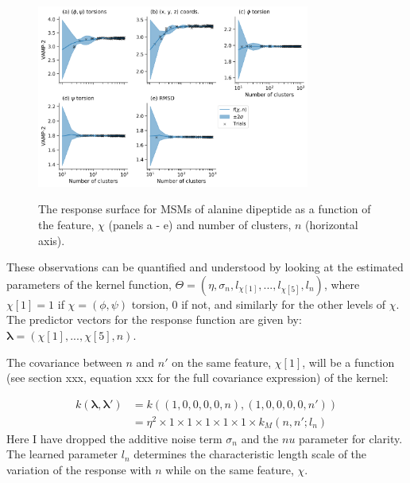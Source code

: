 
\begin{figure}
    \centering
    \caption{The response surface for MSMs of alanine dipeptide as a function of the feature, $\chi$ (panels a - e) and number of clusters, $n$ (horizontal axis).  }
    \includegraphics[width=0.8\textwidth]{chapters/msm_optimization/figures/ala1_response_surface.png}
    \label{fig:ala1_response}
\end{figure}

These observations can be quantified and understood by looking at the estimated parameters of the kernel function, $\Theta = (\eta, \sigma_n, l_{\chi[1]}, ..., l_{\chi[5]}, l_{n}) $, where $\chi[1] = 1$ if $\chi = (\phi, \psi)$ torsion, $0$ if not, and similarly for the other levels of $\chi$. The predictor vectors for the response function are given by: $\mathbf{\lambda} = \left(\chi[1],...,\chi[5],n\right)$.

The covariance between $n$ and $n'$ on the same feature, $\chi[1]$, will be a function (see section xxx, equation xxx for the full covariance expression) of the kernel:

\begin{equation}
\begin{split}
    k(\mathbf{\lambda}, \mathbf{\lambda}')& = k\left((1, 0, 0, 0, 0, n), (1, 0, 0, 0, 0, n')\right) \\
    & = \eta^{2}\times 1 \times 1\times 1 \times 1\times 1 \times k_{M}(n, n'; l_{n})
\end{split}
\end{equation}
Here I have dropped the additive noise term $\sigma_{n}$ and the $nu$ parameter for clarity. The learned parameter $l_{n}$ determines the characteristic length scale of the variation of the response with $n$ while on the same feature, $\chi$.

